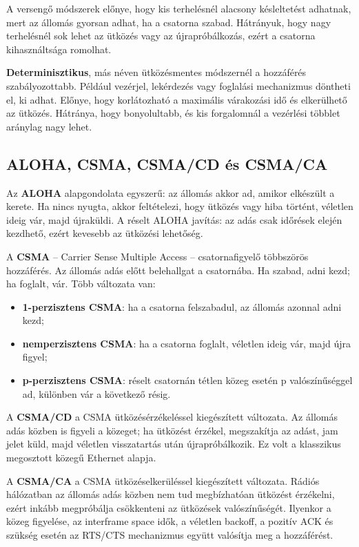 A versengő módszerek előnye, hogy kis terhelésnél alacsony késleltetést adhatnak, mert az állomás gyorsan adhat, ha a csatorna szabad. Hátrányuk, hogy nagy terhelésnél sok lehet az ütközés vagy az újrapróbálkozás, ezért a csatorna kihasználtsága romolhat.

\textbf{Determinisztikus}, más néven ütközésmentes módszernél a hozzáférés szabályozottabb. Például vezérjel, lekérdezés vagy foglalási mechanizmus döntheti el, ki adhat. Előnye, hogy korlátozható a maximális várakozási idő és elkerülhető az ütközés. Hátránya, hogy bonyolultabb, és kis forgalomnál a vezérlési többlet aránylag nagy lehet.

\subsection{ALOHA, CSMA, CSMA/CD és CSMA/CA}

Az \textbf{ALOHA} alapgondolata egyszerű: az állomás akkor ad, amikor elkészült a kerete. Ha nincs nyugta, akkor feltételezi, hogy ütközés vagy hiba történt, véletlen ideig vár, majd újraküldi. A réselt ALOHA javítás: az adás csak időrések elején kezdhető, ezért kevesebb az ütközési lehetőség.

A \textbf{CSMA} -- Carrier Sense Multiple Access -- csatornafigyelő többszörös hozzáférés. Az állomás adás előtt belehallgat a csatornába. Ha szabad, adni kezd; ha foglalt, vár. Több változata van:

\begin{itemize}
  \item \textbf{1-perzisztens CSMA}: ha a csatorna felszabadul, az állomás azonnal adni kezd;
  \item \textbf{nemperzisztens CSMA}: ha a csatorna foglalt, véletlen ideig vár, majd újra figyel;
  \item \textbf{p-perzisztens CSMA}: réselt csatornán tétlen közeg esetén p valószínűséggel ad, különben vár a következő résig.
\end{itemize}

A \textbf{CSMA/CD} a CSMA ütközésérzékeléssel kiegészített változata. Az állomás adás közben is figyeli a közeget; ha ütközést érzékel, megszakítja az adást, jam jelet küld, majd véletlen visszatartás után újrapróbálkozik. Ez volt a klasszikus megosztott közegű Ethernet alapja.

A \textbf{CSMA/CA} a CSMA ütközéselkerüléssel kiegészített változata. Rádiós hálózatban az állomás adás közben nem tud megbízhatóan ütközést érzékelni, ezért inkább megpróbálja csökkenteni az ütközések valószínűségét. Ilyenkor a közeg figyelése, az interframe space idők, a véletlen backoff, a pozitív ACK és szükség esetén az RTS/CTS mechanizmus együtt valósítja meg a hozzáférést.

